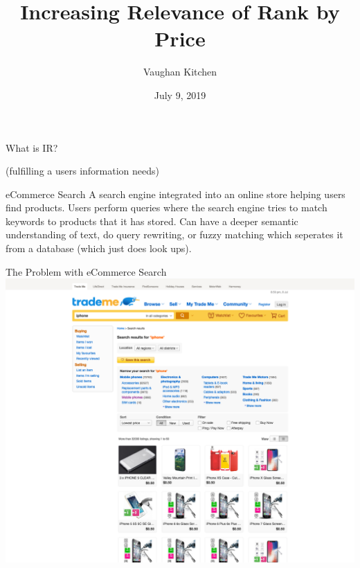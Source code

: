 \documentclass{beamer}
\title{Increasing Relevance of Rank by Price}
\author{Vaughan Kitchen}
\date{July 9, 2019}
\begin{document}
\begin{frame}
\titlepage
\end{frame}

\begin{frame}{What is IR?}

	(fulfilling a users information needs)

\end{frame}

\begin{frame}{eCommerce Search}
	A search engine integrated into an online store helping users find products. Users perform queries where the search engine tries to match keywords to products that it has stored. Can have a deeper semantic understanding of text, do query rewriting, or fuzzy matching which seperates it from a database (which just does look ups).
\end{frame}

\begin{frame}{The Problem with eCommerce Search}
	\includegraphics[width=\linewidth]{trademe-iphone.png}
\end{frame}
\end{document}

